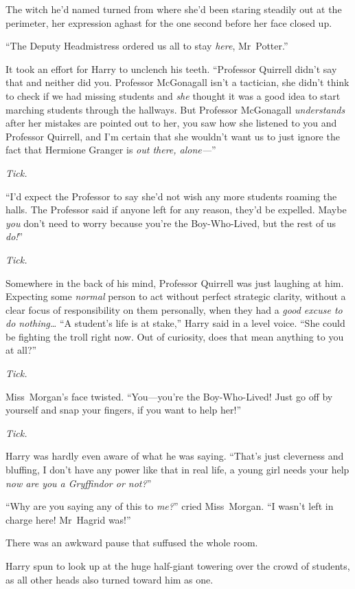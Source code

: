 The witch he’d named turned from where she’d been staring steadily out at the
perimeter, her expression aghast for the one second before her face closed up.

“The Deputy Headmistress ordered us all to stay \emph{here}, Mr~Potter.”

It took an effort for Harry to unclench his teeth. “Professor Quirrell didn’t
say that and neither did you. Professor McGonagall isn’t a tactician, she
didn’t think to check if we had missing students and \emph{she} thought it was
a good idea to start marching students through the hallways. But Professor
McGonagall \emph{understands} after her mistakes are pointed out to her, you
saw how she listened to you and Professor Quirrell, and I’m certain that she
wouldn’t want us to just ignore the fact that Hermione Granger is \emph{out
there, alone—}”

\emph{Tick.}

“I’d expect the Professor to say she’d not wish any more students roaming the
halls. The Professor said if anyone left for any reason, they’d be expelled.
Maybe \emph{you} don’t need to worry because you’re the Boy-Who-Lived, but the
rest of us \emph{do!}”

\emph{Tick.}

Somewhere in the back of his mind, Professor Quirrell was just laughing at him.
Expecting some \emph{normal} person to act without perfect strategic clarity,
without a clear focus of responsibility on them personally, when they had a
\emph{good excuse to do nothing…} “A student’s life is at stake,” Harry
said in a level voice. “She could be fighting the troll right now. Out of
curiosity, does that mean anything to you at all?”

\emph{Tick.}

Miss~Morgan’s face twisted. “You—you’re the Boy-Who-Lived! Just go off by
yourself and snap your fingers, if you want to help her!”

\emph{Tick.}

Harry was hardly even aware of what he was saying. “That’s just cleverness and
bluffing, I don’t have any power like that in real life, a young girl needs
your help \emph{now are you a Gryffindor or not?}”

“Why are you saying any of this to \emph{me?}” cried Miss~Morgan. “I wasn’t
left in charge here! Mr~Hagrid was!”

There was an awkward pause that suffused the whole room.

Harry spun to look up at the huge half-giant towering over the crowd of
students, as all other heads also turned toward him as one.

